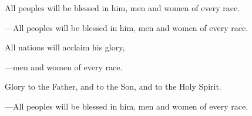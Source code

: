 \responsory

\begin{hangpar}
All peoples will be blessed in him, men and women of every race.

{\color{red}---\thinspace }All peoples will be blessed in him, men and women of every race.

\medskip All nations will acclaim his glory,

{\color{red}---\thinspace }men and women of every race.

\medskip Glory to the Father, and to the Son, and to the Holy Spirit.

{\color{red}---\thinspace }All peoples will be blessed in him, men and women of every race.
\end{hangpar}